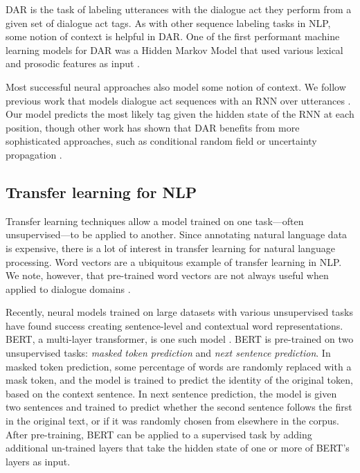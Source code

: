 \documentclass[11pt,a4paper]{article}
\begin{document}
DAR is the task of labeling utterances with the dialogue act they perform from a given set of dialogue act tags.
As with other sequence labeling tasks in NLP, some notion of context is helpful in DAR.
One of the first performant machine learning models for DAR was a Hidden Markov Model that used various lexical and prosodic features as input \citep{stolckeDialogueActModeling2000}.

Most successful neural approaches also model some notion of context.
We follow previous work that models dialogue act sequences with an RNN over utterances \citep{kalchbrennerRecurrentConvolutionalNeural2013,tranHierarchicalNeuralModel2017,botheContextbasedApproachDialogue2018}.
Our model predicts the most likely tag given the hidden state of the RNN at each position, though other work has shown that DAR benefits from more sophisticated approaches, such as conditional random field \citep{chenDialogueActRecognition2017} or uncertainty propagation \citep{tranPreservingDistributionalInformation2017}.


\subsection{Transfer learning for NLP}
Transfer learning techniques allow a model trained on one task---often unsupervised---to be applied to another. 
Since annotating natural language data is expensive, there is a lot of interest in transfer learning for natural language processing. 
Word vectors \citep[e.g.,][]{mikolovDistributedRepresentationsWords2013,penningtonGloveGlobalVectors2014} are a ubiquitous example of transfer learning in NLP.
We note, however, that pre-trained word vectors are not always useful when applied to dialogue domains \cite{cerisaraEffectsUsingWord2vec2017}. 

Recently, neural models trained on large datasets with various unsupervised tasks have found success creating sentence-level and contextual word representations. 
BERT, a multi-layer transformer, is one such model \citep{devlinBERTPretrainingDeep2018}. 
BERT is pre-trained on two unsupervised tasks: \emph{masked token prediction} and \emph{next sentence prediction}.
In masked token prediction, some percentage of words are randomly replaced with a mask token, and the model is trained to predict the identity of the original token, based on the context sentence.
In next sentence prediction, the model is given two sentences and trained to predict whether the second sentence follows the first in the original text, or if it was randomly chosen from elsewhere in the corpus.
After pre-training, BERT can be applied to a supervised task by adding additional un-trained layers that take the hidden state of one or more of BERT's layers as input. 
\end{document}
